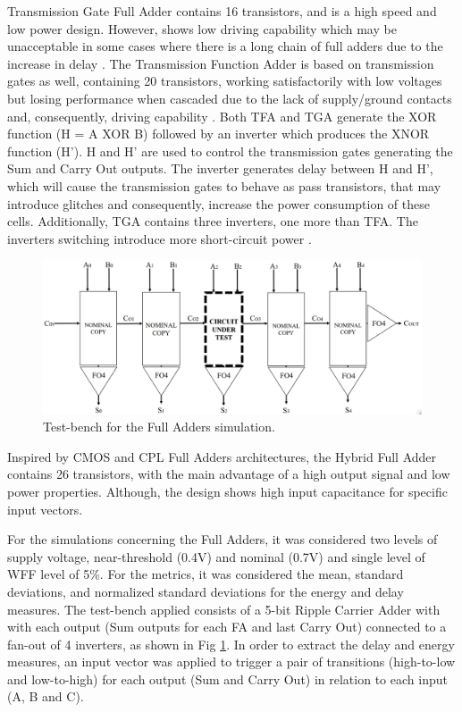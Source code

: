 \documentclass[diss,pgmicro,english]{iiufrgs}
\begin{document}
Transmission Gate Full Adder \cite{weste1985principles} contains 16 transistors, and is a high speed and low power design. However, shows low driving capability which may be unacceptable in some cases where there is a long chain of full adders due to the increase in delay \cite{islam2011design}. The Transmission Function Adder is based on transmission gates as well, containing 20 transistors, working satisfactorily with low voltages but losing performance when cascaded due to the lack of supply/ground contacts and, consequently, driving capability \cite{navi2009novel}. Both TFA and TGA generate the XOR function (H = A XOR B) followed by an inverter which produces the XNOR function (H’). H and H’ are used to control the transmission gates generating the Sum and Carry Out outputs. The inverter generates delay between H and H’, which will cause the transmission gates to behave as pass transistors, that may introduce glitches and consequently, increase the power consumption of these cells. Additionally, TGA contains three inverters, one more than TFA. The inverters switching introduce more short-circuit power \cite{shams2000novel}.

\begin{figure}[b]
\centering
\includegraphics[width=\textwidth, trim={0cm 0cm 0cm 0cm},clip]{testbenchFA.png}
\caption{Test-bench for the Full Adders simulation.}
\label{fig:tbFA}
\end{figure}

Inspired by CMOS and CPL Full Adders architectures, the Hybrid Full Adder \cite{navi2009novel} contains 26 transistors, with the main advantage of a high output signal and low power properties. Although, the design shows high input capacitance for specific input vectors.

For the simulations concerning the Full Adders, it was considered two levels of supply voltage, near-threshold (0.4V) and nominal (0.7V) and single level of WFF level of 5\%. For the metrics, it was considered the mean, standard deviations, and normalized standard deviations for the energy and delay measures. The test-bench applied consists of a 5-bit Ripple Carrier Adder with with each output (Sum outputs for each FA and last Carry Out) connected to a fan-out of 4 inverters, as shown in Fig \ref{fig:tbFA}. In order to extract the delay and energy measures, an input vector was applied to trigger a pair of transitions (high-to-low and low-to-high) for each output (Sum and Carry Out) in relation to each input (A, B and C).
\end{document}
